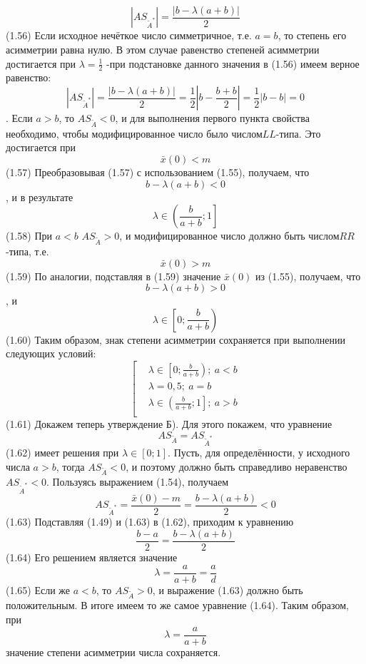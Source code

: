 	\[\left| A{{S}_{{{{\tilde{A}}}^{*}}}} \right|=\frac{\left| b-\lambda \left( a+b \right) \right|}{2}\] 	(1.56)
Если исходное нечёткое число симметричное, т.е. $a=b$, то степень его асимметрии равна нулю. В этом случае равенство степеней асимметрии достигается при $\lambda =\frac{1}{2}$ -при подстановке данного значения в (1.56) имеем верное равенство:
	\[\left| A{{S}_{{{{\tilde{A}}}^{*}}}} \right|=\frac{\left| b-\lambda \left( a+b \right) \right|}{2}=\frac{1}{2}\left| b-\frac{b+b}{2} \right|=\frac{1}{2}\left| b-b \right|=0\].
Если $a>b$, то $A{{S}_{{\tilde{A}}}}<0$, и для выполнения первого пункта свойства необходимо, чтобы модифицированное число было числом$LL$-типа. Это достигается при 
	\[\bar{x}\left( 0 \right)<m\] 	(1.57)
Преобразовывая (1.57) с использованием (1.55), получаем, что \[b-\lambda \left( a+b \right)<0\], и в результате 
	\[\lambda \in \left( \frac{b}{a+b};1 \right]\] 	(1.58)
При $a<b$ $A{{S}_{{\tilde{A}}}}>0$, и модифицированное число должно быть числом$RR$-типа, т.е. 
	\[\bar{x}\left( 0 \right)>m\] 	(1.59)
По аналогии, подставляя в (1.59) значение $\bar{x}\left( 0 \right)$ из (1.55), получаем, что \[b-\lambda \left( a+b \right)>0\], и 
	\[\lambda \in \left[ 0;\frac{b}{a+b} \right)\] 	(1.60)
Таким образом, знак степени асимметрии сохраняется при выполнении следующих условий:
	\[\left[ \begin{aligned}
  & \lambda \in \left[ 0;\frac{b}{a+b} \right);\ a<b \\ 
 & \lambda =0,5;\ a=b \\ 
 & \lambda \in \left( \frac{b}{a+b};1 \right];\ a>b \\ 
\end{aligned} \right.\] 	(1.61)
Докажем теперь утверждение Б). Для этого покажем, что уравнение
	\[A{{S}_{{\tilde{A}}}}=A{{S}_{{{{\tilde{A}}}^{*}}}}\] 	(1.62)
имеет решения при $\lambda \in \left[ 0;1 \right]$. Пусть, для определённости, у исходного числа $a>b$, тогда $A{{S}_{{\tilde{A}}}}<0$, и поэтому должно быть справедливо неравенство$A{{S}_{{{{\tilde{A}}}^{*}}}}<0$. Пользуясь выражением (1.54), получаем
	\[A{{S}_{{{{\tilde{A}}}^{*}}}}=\frac{\bar{x}\left( 0 \right)-m}{2}=\frac{b-\lambda \left( a+b \right)}{2}<0\] 	(1.63)
Подставляя (1.49) и (1.63) в (1.62), приходим к уравнению
	\[\frac{b-a}{2}=\frac{b-\lambda \left( a+b \right)}{2}\] 	(1.64)
Его решением является значение
	\[\lambda =\frac{a}{a+b}=\frac{a}{d}\] 	(1.65)
Если же $a<b$, то $A{{S}_{{\tilde{A}}}}>0$, и выражение (1.63) должно быть положительным. В итоге имеем то же самое уравнение (1.64).
Таким образом, при \[\lambda =\frac{a}{a+b}\] значение степени асимметрии числа сохраняется.
